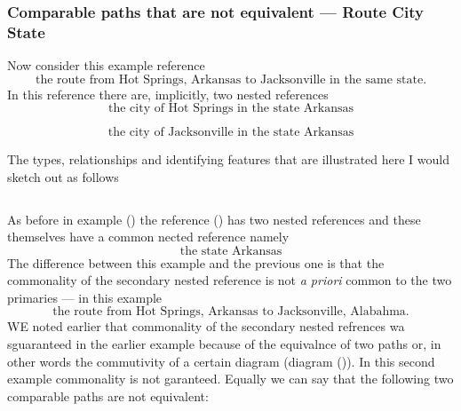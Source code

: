 \subsubsection {Comparable paths that are not equivalent --- Route City State}
\mynote {}
Now consider this example reference
\begin{equation}
\mbox{the route from Hot Springs, Arkansas to Jacksonville in the same state.}
\end{equation}
In this reference there are, implicitly, two nested references
\begin{equation}
\mbox{the city of Hot Springs in the state  Arkansas}
\end{equation}

\begin{equation}
\mbox{the city of Jacksonville in the state  Arkansas}
\end{equation}

The types, relationships and identifying features that are illustrated here
I would sketch out as follows

\begin{equation*}

\end{equation*}
\begin{equation*}

\end{equation*}


\mynote 
As before in example () the reference () has two nested references and these themselves have a common nected reference namely
\begin{equation*}
\mbox{the state Arkansas}
\end{equation*}
The difference between this example and the previous one is that the commonality of the secondary nested reference is not  \textit{a priori}
 common to the two primaries --- in this example
 \begin{equation*}
 \mbox{the route from Hot Springs, Arkansas to Jacksonville, Alabahma.}
\end{equation*}
\mynote
WE noted earlier that commonality of the secondary nested refrences wa sguaranteed in the earlier example because of the equivalnce of two paths or, in other words the commutivity of a certain diagram (diagram ()).
In this second example commonality is not garanteed. Equally we can say that the following two comparable paths are not equivalent:

